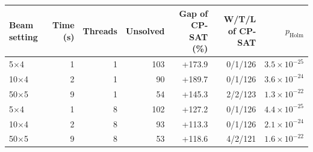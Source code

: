 \begin{tabular}{lrrrrrr}
\toprule
Beam setting & Time (s) & Threads & Unsolved & Gap of CP-SAT (\%) & W/T/L of CP-SAT & $p_{\mathrm{Holm}}$ \\
\midrule
5$\times$4 & 1 & 1 & 103 & +173.9 & 0/1/126 & $3.5 \times 10^{-25}$ \\
10$\times$4 & 2 & 1 & 90 & +189.7 & 0/1/126 & $3.6 \times 10^{-24}$ \\
50$\times$5 & 9 & 1 & 54 & +145.3 & 2/2/123 & $1.3 \times 10^{-22}$ \\
\midrule
5$\times$4 & 1 & 8 & 102 & +127.2 & 0/1/126 & $4.4 \times 10^{-25}$ \\
10$\times$4 & 2 & 8 & 93 & +113.3 & 0/1/126 & $2.1 \times 10^{-24}$ \\
50$\times$5 & 9 & 8 & 53 & +118.6 & 4/2/121 & $1.6 \times 10^{-22}$ \\
\bottomrule
\end{tabular}
